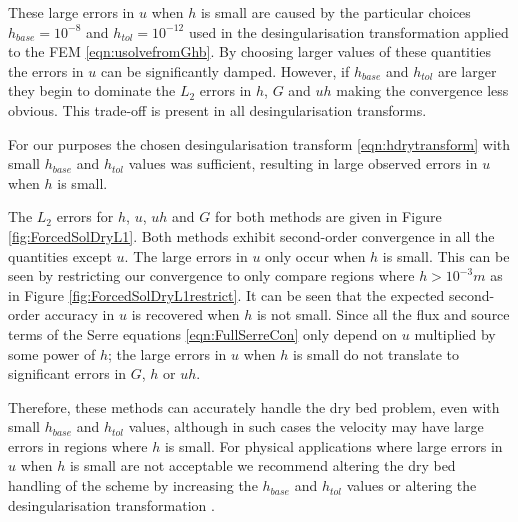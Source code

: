 These large errors in $u$ when $h$ is small are caused by the particular choices $h_{{base}} = 10^{-8}$ and $h_{{tol}}  = 10^{-12}$ used in the desingularisation transformation applied to the FEM \eqref{eqn:usolvefromGhb}. By choosing larger values of these quantities the errors in $u$ can be significantly damped. However, if $h_{{base}}$ and $h_{{tol}}$ are larger they begin to dominate the $L_2$ errors in $h$, $G$ and $uh$ making the convergence less obvious. This trade-off is present in all desingularisation transforms. 

For our purposes the chosen desingularisation transform \eqref{eqn:hdrytransform} with small $h_{{base}}$ and $h_{{tol}}$ values was sufficient, resulting in large observed errors in $u$ when $h$ is small.


The $L_2$ errors for $h$, $u$, $uh$ and $G$ for both methods are given in Figure \ref{fig:ForcedSolDryL1}. Both methods exhibit second-order convergence in all the quantities except $u$. The large errors in $u$ only occur when $h$ is small. This can be seen by restricting our convergence to only compare regions where $h > 10^{-3} m$ as in Figure \ref{fig:ForcedSolDryL1restrict}. It can be seen that the expected second-order accuracy in $u$ is recovered when $h$ is not small. Since all the flux and source terms of the Serre equations \eqref{eqn:FullSerreCon} only depend on $u$ multiplied by some power of $h$; the large errors in $u$ when $h$ is small do not translate to significant errors in $G$, $h$ or $uh$. 

Therefore, these methods can accurately handle the dry bed problem, even with small $h_{{base}}$ and $h_{{tol}}$ values, although in such cases the velocity may have large errors in regions where $h$ is small. For physical applications where large errors in $u$ when $h$ is small are not acceptable we recommend altering the dry bed handling of the scheme by increasing the $h_{{base}}$ and $h_{{tol}}$ values or altering the desingularisation transformation \cite{Kurganov-Petrova-2007-707}. 

